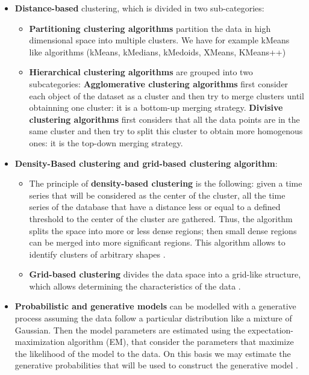 \begin{itemize}
\item   \textbf{Distance-based} clustering, which is divided in two sub-categories:
	\begin{itemize}
	\item \textbf{Partitioning clustering algorithms}  partition the data in        	high dimensional space into multiple clusters. We have for example kMeans like 		algorithms (kMeans, kMedians, kMedoids, XMeans, KMeans++)
	\item \textbf{Hierarchical clustering algorithms} are grouped into two 				subcategories: \textbf{Agglomerative clustering algorithms} first consider each 		object of the dataset as a cluster and then try to merge clusters until  obtainning 		one cluster: it is a bottom-up merging strategy. \textbf{Divisive clustering 			algorithms} first considers that all the data points are in the same cluster 		and then try to split this cluster to obtain more homogenous ones: it is the top-down merging strategy.
	\end{itemize}
   
\item \textbf{Density-Based clustering and grid-based clustering algorithm}:
 
\begin{itemize}
	\item The principle of \textbf{density-based clustering} is the following:   given a time 		series that will be considered as the center of the cluster,  all the time series of the database that have a distance less or 		equal to a defined threshold to the center of the cluster are gathered. Thus, the 			algorithm splits the space into more or less dense regions; then small dense  			regions can be merged into more significant regions. This algorithm allows to identify  		clusters of arbitrary shapes  \cite{kriegel2011density}.
	\item \textbf{Grid-based clustering} divides the data space into a grid-like 				structure, which allows determining the characteristics of the data \cite{amini2011study}.
\end{itemize}


\item \textbf{Probabilistic and generative models} can be modelled  with a generative process assuming the data follow a particular distribution like a mixture of Gaussian. Then the model parameters are estimated using the expectation-maximization algorithm (EM), that consider the parameters that maximize the likelihood of the model to the data. On this basis we may estimate the generative probabilities that will be used to construct the generative model \cite{merugu2003privacy}.



\end{itemize}
